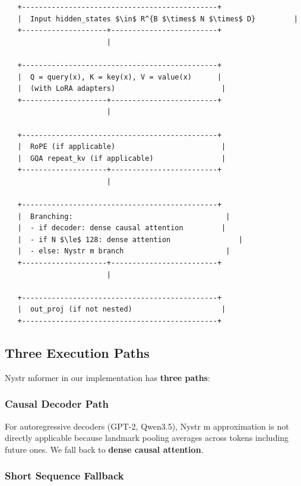 \begin{lstlisting}
   +----------------------------------------------+
   |  Input hidden_states $\in$ R^{B $\times$ N $\times$ D}         |
   +--------------------+-------------------------+
                        |
                         
   +----------------------------------------------+
   |  Q = query(x), K = key(x), V = value(x)      |
   |  (with LoRA adapters)                         |
   +--------------------+-------------------------+
                        |
                         
   +----------------------------------------------+
   |  RoPE (if applicable)                         |
   |  GQA repeat_kv (if applicable)                |
   +--------------------+-------------------------+
                        |
                         
   +----------------------------------------------+
   |  Branching:                                    |
   |  - if decoder: dense causal attention         |
   |  - if N $\le$ 128: dense attention                |
   |  - else: Nystr m branch                        |
   +--------------------+-------------------------+
                        |
                         
   +----------------------------------------------+
   |  out_proj (if not nested)                     |
   +----------------------------------------------+
\end{lstlisting}

\subsection{Three Execution Paths}

Nystr mformer in our implementation has \textbf{three paths}:

\subsubsection{Causal Decoder Path}

For autoregressive decoders (GPT-2, Qwen3.5), Nystr m approximation is 
not directly applicable because landmark pooling averages across tokens 
including future ones. We fall back to \textbf{dense causal attention}.

\subsubsection{Short Sequence Fallback}


